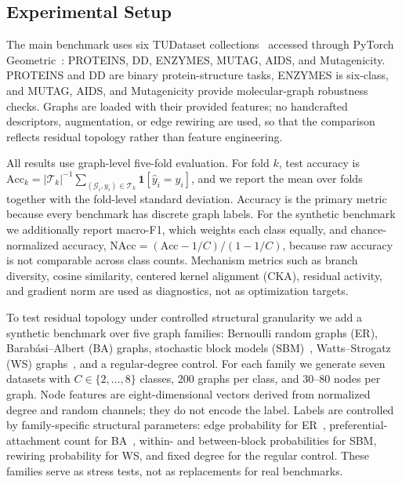 \subsection{Experimental Setup}
\label{sec:setup}

The main benchmark uses six TUDataset collections~\cite{morris2020tudataset}
accessed through PyTorch Geometric~\cite{fey2019fast}: PROTEINS, DD, ENZYMES,
MUTAG, AIDS, and Mutagenicity. PROTEINS and DD are binary protein-structure
tasks, ENZYMES is six-class, and MUTAG, AIDS, and Mutagenicity provide
molecular-graph robustness checks. Graphs are loaded with their provided
features; no handcrafted descriptors, augmentation, or edge rewiring are used,
so that the comparison reflects residual topology rather than feature
engineering.

All results use graph-level five-fold evaluation. For fold \(k\), test accuracy
is \(\mathrm{Acc}_{k}=|\mathcal{T}_{k}|^{-1}\sum_{(\mathcal{G}_{i},y_{i})\in\mathcal{T}_{k}}
\mathbf{1}[\hat{y}_{i}=y_{i}]\), and we report the mean over folds together with
the fold-level standard deviation. Accuracy is the primary metric because every
benchmark has discrete graph labels. For the synthetic benchmark we additionally
report macro-F1, which weights each class equally, and chance-normalized
accuracy, \(\mathrm{NAcc}=(\mathrm{Acc}-1/C)/(1-1/C)\), because raw accuracy is
not comparable across class counts. Mechanism metrics such as branch diversity,
cosine similarity, centered kernel alignment (CKA), residual activity, and
gradient norm are used as diagnostics, not as optimization targets.

To test residual topology under controlled structural granularity we add a
synthetic benchmark over five graph families: Bernoulli random graphs (ER),
Barab\'asi--Albert (BA) graphs, stochastic block models
(SBM)~\cite{holland1983stochastic}, Watts--Strogatz (WS)
graphs~\cite{watts1998collective}, and a regular-degree control. For each family
we generate seven datasets with \(C\in\{2,\ldots,8\}\) classes, 200 graphs per
class, and 30--80 nodes per graph. Node features are eight-dimensional vectors
derived from normalized degree and random channels; they do not encode the
label. Labels are controlled by family-specific structural parameters: edge
probability for ER~\cite{gilbert1959random}, preferential-attachment count for
BA~\cite{barabasi1999emergence}, within- and between-block probabilities for
SBM, rewiring probability for WS, and fixed degree for the regular control.
These families serve as stress tests, not as replacements for real benchmarks.

